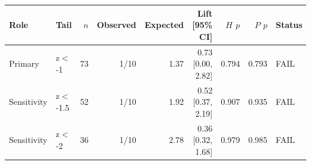 \begin{tabular}{llrrrrrrl}
\toprule
Role & Tail & $n$ & Observed & Expected & Lift [95\% CI] & $H$ $p$ & $P$ $p$ & Status \\
\midrule
Primary & z$<$-1 & 73 & 1/10 & 1.37 & 0.73 [0.00, 2.82] & 0.794 & 0.793 & FAIL \\
Sensitivity & z$<$-1.5 & 52 & 1/10 & 1.92 & 0.52 [0.37, 2.19] & 0.907 & 0.935 & FAIL \\
Sensitivity & z$<$-2 & 36 & 1/10 & 2.78 & 0.36 [0.32, 1.68] & 0.979 & 0.985 & FAIL \\
\bottomrule
\end{tabular}
